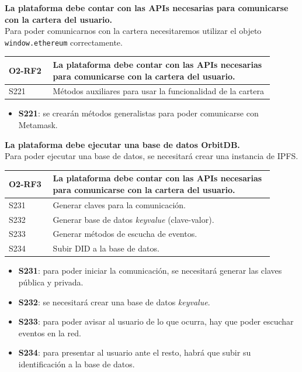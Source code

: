 \textbf{La plataforma debe contar con las APIs necesarias para comunicarse con la cartera del usuario.}\\
Para poder comunicarnos con la cartera necesitaremos utilizar el objeto \verb|window.ethereum| correctamente.
\begin{center}
    \begin{table}[h!]
        \begin{tabular}{|p{0.15\linewidth} | p{0.75\linewidth}|}
            \hline
             
            \textbf{O2-RF2} & \textbf{La plataforma debe contar con las APIs necesarias para comunicarse con la cartera del usuario.} \\
            \hline
            S221     & Métodos auxiliares para usar la funcionalidad de la cartera \\
            \hline
        \end{tabular}
    \end{table}
\end{center}
\begin{itemize}
    \item \textbf{S221}: se crearán métodos generalistas para poder comunicarse con Metamask.
\end{itemize}
\textbf{La plataforma debe ejecutar una base de datos OrbitDB.}\\
Para poder ejecutar una base de datos, se necesitará crear una instancia de IPFS.
\begin{center}
    \begin{table}[h!]
        \begin{tabular}{|p{0.15\linewidth} | p{0.75\linewidth}|}
            \hline
             
            \textbf{O2-RF3} & \textbf{La plataforma debe contar con las APIs necesarias para comunicarse con la cartera del usuario.} \\
            \hline
            S231     & Generar claves para la comunicación. \\
            \hline
            S232     & Generar base de datos \textit{keyvalue} (clave-valor). \\
            \hline
            S233     & Generar métodos de escucha de eventos. \\
            \hline
            S234     & Subir DID a la base de datos. \\
            \hline
        \end{tabular}
    \end{table}
\end{center}
\begin{itemize}
    \item \textbf{S231}: para poder iniciar la comunicación, se necesitará generar las claves pública y privada.
    \item \textbf{S232}: se necesitará crear una base de datos \textit{keyvalue}.
    \item \textbf{S233}: para poder avisar al usuario de lo que ocurra, hay que poder escuchar eventos en la red.
    \item \textbf{S234}: para presentar al usuario ante el resto, habrá que subir su identificación a la base de datos.
\end{itemize}
